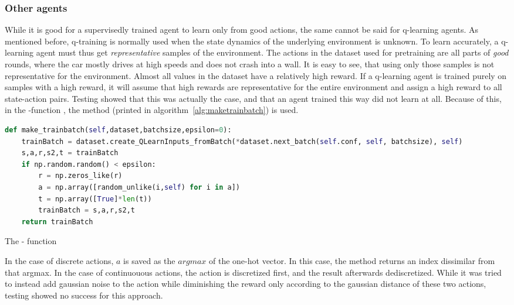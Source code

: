 \subsubsection{Other agents}

While it is good for a supervisedly trained agent to learn only from good actions, the same cannot be said for q-learning agents. As mentioned before, q-training is normally used when the state dynamics of the underlying environment is unknown. To learn accurately, a q-learning agent must thus get \textit{representative} samples of the environment. The actions in the dataset used for pretraining are all parts of \textit{good} rounds, where the car mostly drives at high speeds and does not crash into a wall. It is easy to see, that using only those samples is not representative for the environment. Almost all values in the dataset have a relatively high reward. If a q-learning agent is trained purely on samples with a high reward, it will assume that high rewards are representative for the entire environment and assign a high reward to all state-action pairs. Testing showed that this was actually the case, and that an agent trained this way did not learn at all. Because of this, in the -function , the method  (printed in algorithm~\ref{alg:maketrainbatch}) is used.

\begin{algorithm}[h]
\begin{lstlisting}[language=Python, style=Python, frame=none]
def make_trainbatch(self,dataset,batchsize,epsilon=0):
	trainBatch = dataset.create_QLearnInputs_fromBatch(*dataset.next_batch(self.conf, self, batchsize), self)
	s,a,r,s2,t = trainBatch
	if np.random.random() < epsilon:
		r = np.zeros_like(r)
		a = np.array([random_unlike(i,self) for i in a])
		t = np.array([True]*len(t))
		trainBatch = s,a,r,s2,t
	return trainBatch
\end{lstlisting}%
\caption{The  - function}
\label{alg:maketrainbatch}
\end{algorithm}

In the case of discrete actions, $a$ is saved as the $argmax$ of the one-hot vector. In this case, the method  returns an index dissimilar from that argmax. In the case of continuouous actions, the action is discretized first, and the result afterwards dediscretized. While it was tried to instead add gaussian noise to the action while diminishing the reward only according to the gaussian distance of these two actions, testing showed no success for this approach.

